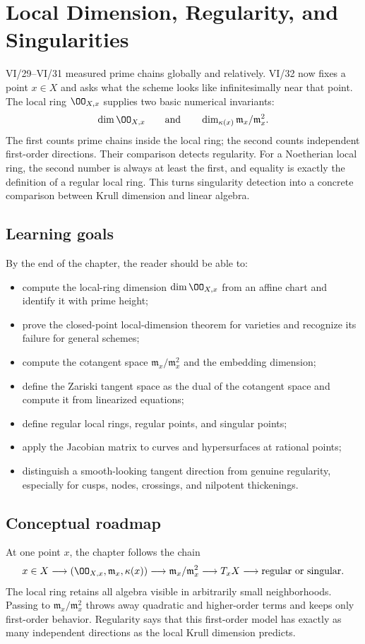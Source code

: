 \chapter{Local Dimension, Regularity, and Singularities}\label{ch:vi32-local-geometry}

VI/29--VI/31 measured prime chains globally and relatively.  VI/32 now fixes a point $x\in X$ and asks what the scheme
looks like infinitesimally near that point.  The local ring $\OO_{X,x}$ supplies two basic numerical invariants:
\[
 \dim\OO_{X,x}
 \qquad\text{and}\qquad
 \dim_{\kappa(x)}\mathfrak m_x/\mathfrak m_x^2.
\]
The first counts prime chains inside the local ring; the second counts independent first-order directions.  Their
comparison detects regularity.  For a Noetherian local ring, the second number is always at least the first, and equality
is exactly the definition of a regular local ring.  This turns singularity detection into a concrete comparison between
Krull dimension and linear algebra.

\section*{Learning goals}
By the end of the chapter, the reader should be able to:
\begin{itemize}
\item compute the local-ring dimension $\dim\OO_{X,x}$ from an affine chart and identify it with prime height;
\item prove the closed-point local-dimension theorem for varieties and recognize its failure for general schemes;
\item compute the cotangent space $\mathfrak m_x/\mathfrak m_x^2$ and the embedding dimension;
\item define the Zariski tangent space as the dual of the cotangent space and compute it from linearized equations;
\item define regular local rings, regular points, and singular points;
\item apply the Jacobian matrix to curves and hypersurfaces at rational points;
\item distinguish a smooth-looking tangent direction from genuine regularity, especially for cusps, nodes, crossings,
  and nilpotent thickenings.
\end{itemize}

\section*{Conceptual roadmap}
At one point $x$, the chapter follows the chain
\[
 x\in X
 \longrightarrow
 (\OO_{X,x},\mathfrak m_x,\kappa(x))
 \longrightarrow
 \mathfrak m_x/\mathfrak m_x^2
 \longrightarrow
 T_xX
 \longrightarrow
 \text{regular or singular}.
\]
The local ring retains all algebra visible in arbitrarily small neighborhoods.  Passing to $\mathfrak m_x/\mathfrak m_x^2$
throws away quadratic and higher-order terms and keeps only first-order behavior.  Regularity says that this first-order
model has exactly as many independent directions as the local Krull dimension predicts.


